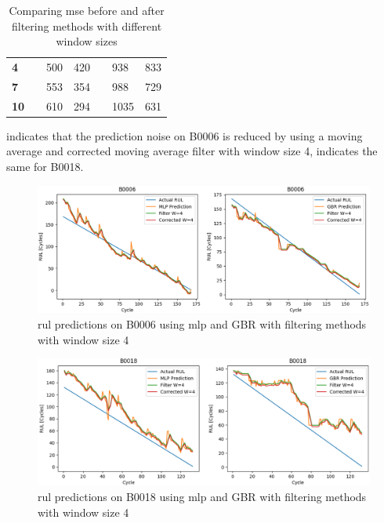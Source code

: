 \documentclass[english, a4paper]{report}
\begin{document}
{{{{\begin{table}[H]
\begin{tabular}{|l|l|l|l|l|l|l|}
                        \textbf{4} &  & 500 & 420 &  & 938 & 833 \\ \cline{1-1} \cline{3-4} \cline{6-7} 
                        \textbf{7} &  & 553 & 354 &  & 988 & 729 \\ \cline{1-1} \cline{3-4} \cline{6-7} 
                        \textbf{10} &  & 610 & 294 &  & 1035 & 631 \\ \hline
                    \end{tabular}
                    \caption{Comparing \gls{mse} before and after filtering methods with different window sizes}
                    \label{MSEBeforeAndAfterOpti2}
                \end{table}
                
                 indicates that the prediction noise on B0006 is reduced by using a moving average and corrected moving average filter with window size 4,  indicates the same for B0018.
                
                \begin{figure}[H]
                    \centering \includegraphics[width=1\textwidth]{FilterPredictionB6}
                    \caption{\gls{rul} predictions on B0006 using \gls{mlp} and GBR with filtering methods with window size 4}
                    \label{fig:FilterPredictionB6}
                \end{figure}
                
                \begin{figure}[H]
                    \centering \includegraphics[width=1\textwidth]{FilterPredictionB18}
                    \caption{\gls{rul} predictions on B0018 using \gls{mlp} and GBR with filtering methods with window size 4}
                    \label{fig:FilterPredictionB18}
                \end{figure}
            }
        }
    }
    
}
\end{document}
